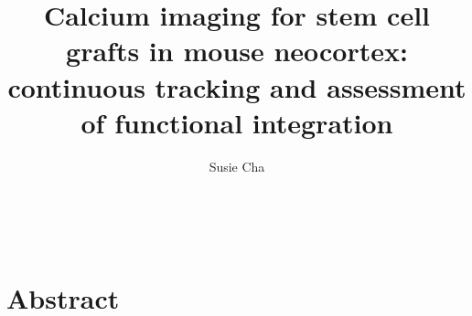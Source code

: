 \title{Calcium imaging for stem cell grafts in mouse neocortex: continuous tracking and assessment of functional integration}
\author{Susie Cha}

\newpage
\tableofcontents
\
\section{Abstract}